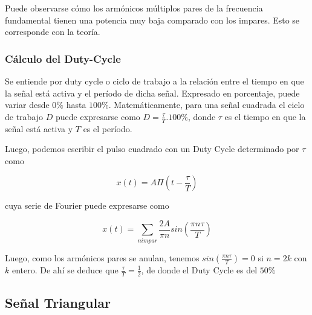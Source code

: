 \begin{table}[H]
\end{table}

Puede observarse cómo los armónicos múltiplos pares de la frecuencia fundamental tienen una potencia muy baja comparado con los impares. Esto se corresponde con la teoría.

\subsubsection{Cálculo del Duty-Cycle}	

Se entiende por duty cycle o ciclo de trabajo a la relación entre el tiempo en que la señal está activa y el período de dicha señal. Expresado en porcentaje, puede variar desde $0\%$ hasta $100\%$. Matemáticamente, para una señal cuadrada el ciclo de trabajo $D$ puede expresarse como $D=\frac{\tau}{T}.100\%$, donde $\tau$ es el tiempo en que la señal está activa y $T$ es el período.

Luego, podemos escribir el pulso cuadrado con un Duty Cycle determinado por $\tau$ como 

\begin{equation}
    x(t)=A\Pi(t-\frac{\tau}{T})
\end{equation}

cuya serie de Fourier puede expresarse como 

\begin{equation}
x(t)=\sum_{n impar}\frac{2A}{\pi n} sin(\frac{\pi n\tau}{T})
\end{equation}

Luego, como los armónicos pares se anulan, tenemos $sin(\frac{\pi n\tau}{T})=0$ si $n=2k$ con $k$ entero. De ahí se deduce que $\frac{\tau}{T}=\frac{1}{2}$, de donde el Duty Cycle es del $50\%$

\subsection{Señal Triangular}


